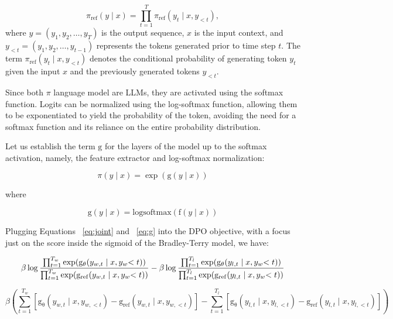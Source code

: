 \documentclass[twoside,11pt]{article}
\begin{document}
\begin{equation}
  \label{eq:joint}
  \pi_\mathrm{ref}(y \mid x) = \prod_{t=1}^T \pi_\mathrm{ref}(y_t \mid x, y_{<t}),
\end{equation}
where \(y = (y_1, y_2, \ldots, y_T)\) is the output sequence, 
\(x\) is the input context, and \(y_{<t} = (y_1, y_2, \ldots, y_{t-1})\) 
represents the tokens generated prior to time step \(t\). The term 
\(\pi_\mathrm{ref}(y_t \mid x, y_{<t})\) denotes the conditional 
probability of generating token \(y_t\) given the input \(x\) and 
the previously generated tokens \(y_{<t}\).

Since both $\pi$ language model are LLMs, they are activated
using the softmax function. Logits can be normalized using the
log-softmax function, allowing them to be exponentiated
to yield the probability of the token, avoiding the need for
a softmax function and its reliance on the entire probability 
distribution.

Let us establish the term $\mathrm{g}$ for the layers of the model up to the softmax
activation, namely, the feature extractor and log-softmax normalization: 

\begin{equation}
  \pi(y \mid x) = \exp (\mathrm{g}(y \mid x))
\end{equation}

where

\begin{equation}
  \label{eq:g}
  \mathrm{g}(y \mid x) = \mathrm{logsoftmax}(\mathrm{f}(y \mid x))
\end{equation}

Plugging Equations ~\ref{eq:joint} and ~\ref{eq:g} into the DPO objective, 
with a focus just on the score
inside the sigmoid of the Bradley-Terry model, we have:

\[
    \beta \log \frac
    {\prod_{t=1}^{T_w} \exp (\mathrm{g_\theta}(y_{w,t} \mid x, y_w{<t}))}
    {\prod_{t=1}^{T_w} \exp (\mathrm{g_\mathrm{ref}}(y_{w,t} \mid x, y_w{<t}))}
    - 
    \beta \log \frac
    {\prod_{t=1}^{T_l} \exp (\mathrm{g_\theta}(y_{l,t} \mid x, y_w{<t}))}
    {\prod_{t=1}^{T_l} \exp (\mathrm{g_\mathrm{ref}}(y_{l,t} \mid x, y_w{<t}))}
    \\
\]

\[
\beta \left( 
\sum_{t=1}^{T_w} \left[ \mathrm{g_\theta}(y_{w,t} \mid x, y_{w,<t}) - \mathrm{g_\mathrm{ref}}(y_{w,t} \mid x, y_{w,<t}) \right] 
- \sum_{t=1}^{T_l} \left[ \mathrm{g_\theta}(y_{l,t} \mid x, y_{l,<t}) - \mathrm{g_\mathrm{ref}}(y_{l,t} \mid x, y_{l,<t}) \right] 
\right)
\]
\end{document}
